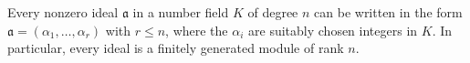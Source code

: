 Every nonzero ideal $\mathfrak{a}$ in a number field $K$ of degree $n$ can be written in the form $\mathfrak{a} = (\alpha_1, \ldots, \alpha_r)$ with $r \leq n$, where the $\alpha_i$ are suitably chosen integers in $K$. In particular, every ideal is a finitely generated module of rank $n$.
